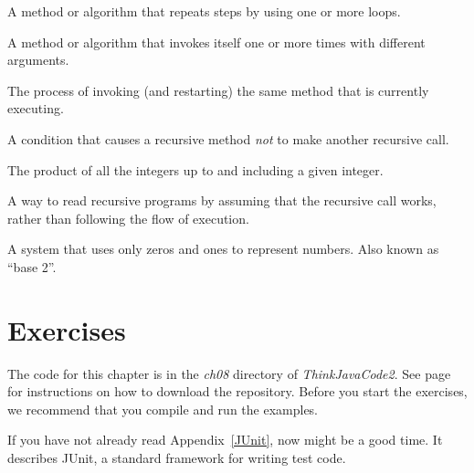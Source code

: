 \begin{description}



A method or algorithm that repeats steps by using one or more loops.

A method or algorithm that invokes itself one or more times with different arguments.

The process of invoking (and restarting) the same method that is currently executing.

A condition that causes a recursive method {\em not} to make another recursive call.


The product of all the integers up to and including a given integer.

A way to read recursive programs by assuming that the recursive call works, rather than following the flow of execution.

A system that uses only zeros and ones to represent numbers.
Also known as ``base 2''.

\end{description}


\section{Exercises}

The code for this chapter is in the {\it ch08} directory of {\it ThinkJavaCode2}.
See page~\pageref{code} for instructions on how to download the repository.
Before you start the exercises, we recommend that you compile and run the examples.

If you have not already read Appendix~\ref{JUnit}, now might be a good time.
It describes JUnit, a standard framework for writing test code.


